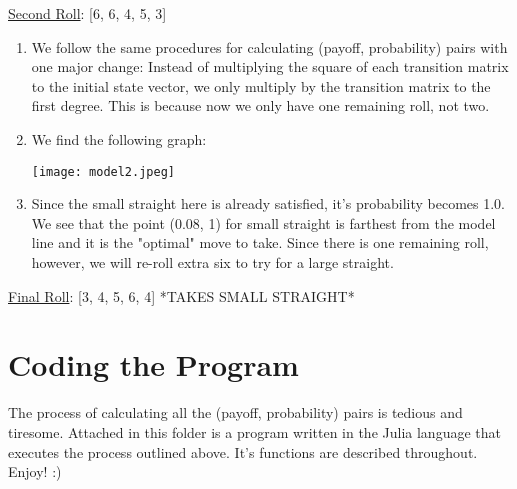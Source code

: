 \documentclass[12pt,a4paper]{article}
\begin{document}
\begin{flushleft}
\underline{Second Roll}: [6, 6, 4, 5, 3]
\end{flushleft}

\begin{enumerate}
    \item We follow the same procedures for calculating (payoff, probability) pairs with one major change: Instead of multiplying the square of each transition matrix to the initial state vector, we only multiply by the transition matrix to the first degree. This is because now we only have one remaining roll, not two.

    \clearpage

    \item We find the following graph:

    \begin{center}
        \texttt{[image: model2.jpeg]}
    \end{center}

    \item Since the small straight here is already satisfied, it's probability becomes 1.0. We see that the point (0.08, 1) for small straight is farthest from the model line and it is the "optimal" move to take. Since there is one remaining roll, however, we will re-roll extra six to try for a large straight.

\end{enumerate}

\begin{flushleft}
\underline{Final Roll}: [3, 4, 5, 6, 4] *TAKES SMALL STRAIGHT*
\end{flushleft}

\section{Coding the Program}

\begin{flushleft}
The process of calculating all the (payoff, probability) pairs is tedious and tiresome. Attached in this folder is a program written in the Julia language that executes the process outlined above. It's functions are described throughout. Enjoy! :)
\end{flushleft}
\end{document}
